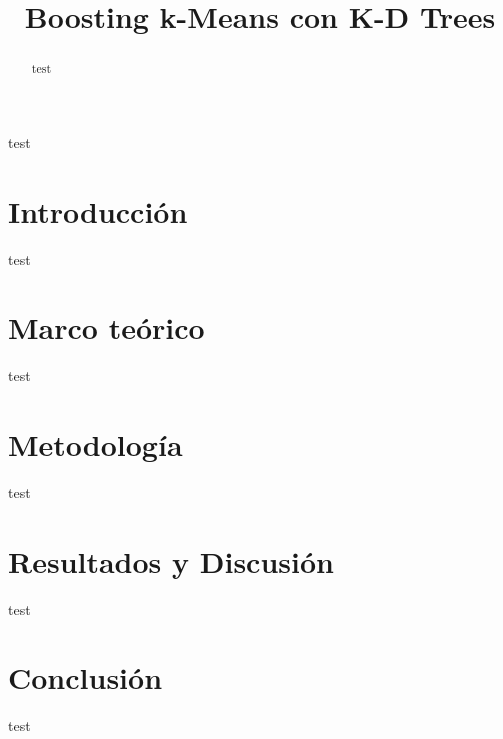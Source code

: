 \documentclass[conference]{IEEEtran}
\begin{document}
\title{Boosting k-Means con K-D Trees}

\author{
}

\maketitle

\begin{abstract}
    test
\end{abstract}

\begin{IEEEkeywords}
    test
\end{IEEEkeywords}

\section{Introducción}
test

\section{Marco teórico}
test

\section{Metodología}
test 

\section{Resultados y Discusión}
test 

\section{Conclusión}
test



\vspace{12pt}
\end{document}

